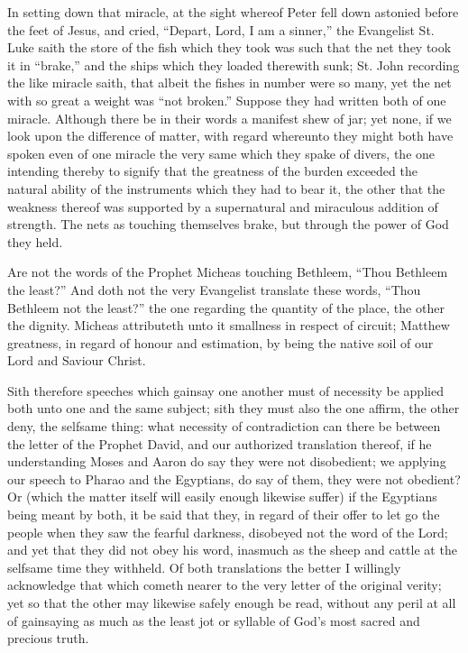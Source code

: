 In setting down that miracle, at the sight whereof Peter fell down astonied before the feet of Jesus, and cried, “Depart, Lord, I am a sinner,” the Evangelist St. Luke saith the store of the fish which they took was such that the net they took it in “brake,” and the ships which they loaded therewith sunk; St. John recording the like miracle saith, that albeit the fishes in number were so many, yet the net with so great a weight was “not broken.” Suppose they had written both of one miracle. Although there be in their words a manifest shew of jar; yet none, if we look upon the difference of matter, with regard whereunto they might both have spoken even of one miracle the very same which they spake of divers, the one intending thereby to signify that the greatness of the burden exceeded the natural ability of the instruments which they had to bear it, the other that the weakness thereof was supported by a supernatural and miraculous addition of strength. The nets as touching themselves brake, but through the power of God they held.

Are not the words of the Prophet Micheas touching Bethleem, “Thou Bethleem the least?” And doth not the very Evangelist translate these words, “Thou Bethleem not the least?” the one regarding the quantity of the place, the other the dignity. Micheas attributeth unto it smallness in respect of circuit; Matthew greatness, in regard of honour  and estimation, by being the native soil of our Lord and Saviour Christ.

Sith therefore speeches which gainsay one another must of necessity be applied both unto one and the same subject; sith they must also the one affirm, the other deny, the selfsame thing: what necessity of contradiction can there be between the letter of the Prophet David, and our authorized translation thereof, if he understanding Moses and Aaron do say they were not disobedient; we applying our speech to Pharao and the Egyptians, do say of them, they were not obedient? Or (which the matter itself will easily enough likewise suffer) if the Egyptians being meant by both, it be said that they, in regard of their offer to let go the people when they saw the fearful darkness, disobeyed not the word of the Lord; and yet that they did not obey his word, inasmuch as the sheep and cattle at the selfsame time they withheld. Of both translations the better I willingly acknowledge that which cometh nearer to the very letter of the original verity; yet so that the other may likewise safely enough be read, without any peril at all of gainsaying as much as the least jot or syllable of God’s most sacred and precious truth.

